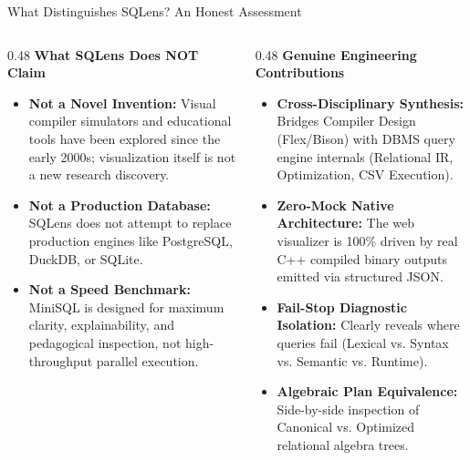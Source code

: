 \documentclass[aspectratio=169,10pt]{beamer}
\begin{document}
\begin{frame}{What Distinguishes SQLens? An Honest Assessment}
    \begin{columns}[T]
        \begin{column}{0.48\textwidth}
            \textbf{What SQLens Does NOT Claim}
            \begin{itemize}\small
                \item \textbf{Not a Novel Invention:} Visual compiler simulators and educational tools have been explored since the early 2000s; visualization itself is not a new research discovery.
                \item \textbf{Not a Production Database:} SQLens does not attempt to replace production engines like PostgreSQL, DuckDB, or SQLite.
                \item \textbf{Not a Speed Benchmark:} MiniSQL is designed for maximum clarity, explainability, and pedagogical inspection, not high-throughput parallel execution.
            \end{itemize}
        \end{column}
        \begin{column}{0.48\textwidth}
            \textbf{Genuine Engineering Contributions}
            \begin{itemize}\small
                \item \textbf{Cross-Disciplinary Synthesis:} Bridges Compiler Design (Flex/Bison) with DBMS query engine internals (Relational IR, Optimization, CSV Execution).
                \item \textbf{Zero-Mock Native Architecture:} The web visualizer is 100\% driven by real C++ compiled binary outputs emitted via structured JSON.
                \item \textbf{Fail-Stop Diagnostic Isolation:} Clearly reveals where queries fail (Lexical vs. Syntax vs. Semantic vs. Runtime).
                \item \textbf{Algebraic Plan Equivalence:} Side-by-side inspection of Canonical vs. Optimized relational algebra trees.
            \end{itemize}
        \end{column}
    \end{columns}
\end{frame}
\end{document}
